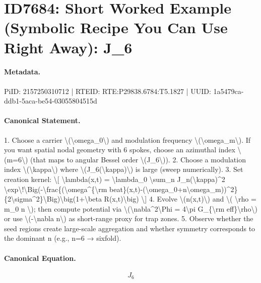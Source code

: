 \section*{ID7684: Short Worked Example (Symbolic Recipe You Can Use Right Away): J\_6}
\paragraph{Metadata.}
PiID: 2157250310712 | RTEID: RTE:P29838.6784:T5.1827 | UUID: 1a5479ca-ddb1-5aca-be54-03055804515d

\paragraph{Canonical Statement.}
1. Choose a carrier \textbackslash{}(\textbackslash{}omega\_0\textbackslash{}) and modulation frequency \textbackslash{}(\textbackslash{}omega\_m\textbackslash{}). If you want spatial nodal geometry with 6 spokes, choose an azimuthal index \textbackslash{}(m=6\textbackslash{}) (that maps to angular Bessel order \textbackslash{}(J\_6\textbackslash{})). 2. Choose a modulation index \textbackslash{}(\textbackslash{}kappa\textbackslash{}) where \textbackslash{}(J\_6(\textbackslash{}kappa)\textbackslash{}) is large (sweep numerically). 3. Set creation kernel: \textbackslash{}[ \textbackslash{}lambda(x,t) = \textbackslash{}lambda\_0 \textbackslash{}sum\_n J\_n(\textbackslash{}kappa)\textasciicircum{}2 \textbackslash{}exp\textbackslash{}!\textbackslash{}Big(-\textbackslash{}frac\{(\textbackslash{}omega\textasciicircum{}\{\textbackslash{}rm beat\}(x,t)-(\textbackslash{}omega\_0+n\textbackslash{}omega\_m))\textasciicircum{}2\}\{2\textbackslash{}sigma\textasciicircum{}2\}\textbackslash{}Big)\textbackslash{}big(1+\textbackslash{}beta R(x,t)\textbackslash{}big) \textbackslash{}] 4. Evolve \textbackslash{}(n(x,t)\textbackslash{}) and \textbackslash{}( \textbackslash{}rho = m\_0 n \textbackslash{}); then compute potential via \textbackslash{}(\textbackslash{}nabla\textasciicircum{}2\textbackslash{}Phi = 4\textbackslash{}pi G\_\{\textbackslash{}rm eff\}\textbackslash{}rho\textbackslash{}) or use \textbackslash{}(-\textbackslash{}nabla n\textbackslash{}) as short-range proxy for trap zones. 5. Observe whether the seed regions create large-scale aggregation and whether symmetry corresponds to the dominant n (e.g., n=6 → sixfold).

\paragraph{Canonical Equation.}
\[
J_6
\]

